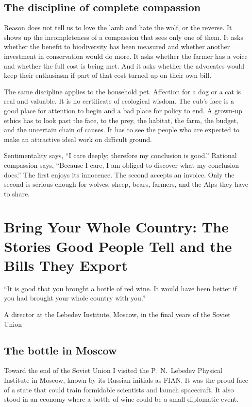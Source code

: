 \documentclass[12pt,a4paper]{book}
\begin{document}
\section{The discipline of complete compassion}

Reason does not tell us to love the lamb and hate the wolf, or the reverse. It shows up the incompleteness of a compassion that sees only one of them. It asks whether the benefit to biodiversity has been measured and whether another investment in conservation would do more. It asks whether the farmer has a voice and whether the full cost is being met. And it asks whether the advocates would keep their enthusiasm if part of that cost turned up on their own bill.

The same discipline applies to the household pet. Affection for a dog or a cat is real and valuable. It is no certificate of ecological wisdom. The cub's face is a good place for attention to begin and a bad place for policy to end. A grown-up ethics has to look past the face, to the prey, the habitat, the farm, the budget, and the uncertain chain of causes. It has to see the people who are expected to make an attractive ideal work on difficult ground.

Sentimentality says, ``I care deeply; therefore my conclusion is good.'' Rational compassion says, ``Because I care, I am obliged to discover what my conclusion does.'' The first enjoys its innocence. The second accepts an invoice. Only the second is serious enough for wolves, sheep, bears, farmers, and the Alps they have to share.


\chapter[Bring Your Whole Country]{Bring Your Whole Country: The Stories Good People Tell and the Bills They Export}
\label{chap:responsible-goodness}

\epigraph{``It is good that you brought a bottle of red wine. It would have
been better if you had brought your whole country with you.''}{A director at
the Lebedev Institute, Moscow, in the final years of the Soviet Union}

\section{The bottle in Moscow}

Toward the end of the Soviet Union I visited the P.~N.~Lebedev Physical Institute in Moscow, known by its Russian initials as FIAN. It was the proud face of a state that could train formidable scientists and launch spacecraft. It also stood in an economy where a bottle of wine could be a small diplomatic event.
\end{document}
